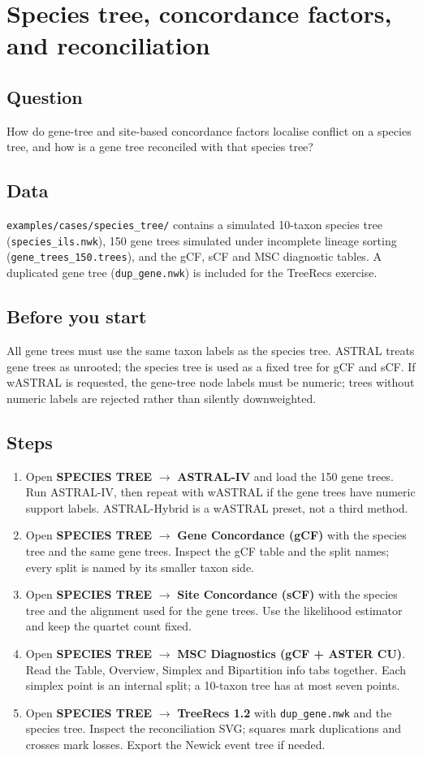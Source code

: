 \documentclass[11pt]{report}
\begin{document}
\chapter{Species tree, concordance factors, and reconciliation}
\section{Question}
How do gene-tree and site-based concordance factors localise conflict on a
species tree, and how is a gene tree reconciled with that species tree?

\section{Data}
\texttt{examples/cases/species\_tree/} contains a simulated 10-taxon species
tree (\texttt{species\_ils.nwk}), 150 gene trees simulated under incomplete
lineage sorting (\texttt{gene\_trees\_150.trees}), and the gCF, sCF and MSC
diagnostic tables. A duplicated gene tree
(\texttt{dup\_gene.nwk}) is included for the TreeRecs exercise.

\section{Before you start}
All gene trees must use the same taxon labels as the species tree. ASTRAL
treats gene trees as unrooted; the species tree is used as a fixed tree for
gCF and sCF. If wASTRAL is requested, the gene-tree node labels must be
numeric; trees without numeric labels are rejected rather than silently
downweighted.

\section{Steps}
\begin{enumerate}
  \item Open \textbf{SPECIES TREE} $\rightarrow$ \textbf{ASTRAL-IV} and load
  the 150 gene trees. Run ASTRAL-IV, then repeat with wASTRAL if the gene
  trees have numeric support labels. ASTRAL-Hybrid is a wASTRAL preset, not a
  third method.
  \item Open \textbf{SPECIES TREE} $\rightarrow$ \textbf{Gene Concordance
  (gCF)} with the species tree and the same gene trees. Inspect the gCF table
  and the split names; every split is named by its smaller taxon side.
  \item Open \textbf{SPECIES TREE} $\rightarrow$ \textbf{Site Concordance
  (sCF)} with the species tree and the alignment used for the gene trees.
  Use the likelihood estimator and keep the quartet count fixed.
  \item Open \textbf{SPECIES TREE} $\rightarrow$ \textbf{MSC Diagnostics
  (gCF + ASTER CU)}. Read the Table, Overview, Simplex and Bipartition info
  tabs together. Each simplex point is an internal split; a 10-taxon tree has
  at most seven points.
  \item Open \textbf{SPECIES TREE} $\rightarrow$ \textbf{TreeRecs 1.2} with
  \texttt{dup\_gene.nwk} and the species tree. Inspect the reconciliation SVG;
  squares mark duplications and crosses mark losses. Export the Newick event
  tree if needed.
\end{enumerate}
\end{document}
